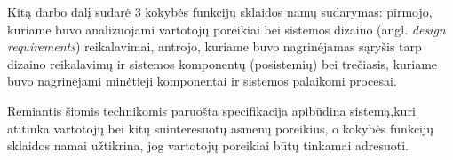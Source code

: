 \documentclass{VUMIFPSkursinis}
\begin{document}
Kitą darbo dalį sudarė 3 kokybės funkcijų sklaidos namų sudarymas: pirmojo, kuriame buvo analizuojami vartotojų poreikiai bei
sistemos dizaino (angl. \textit{design requirements}) reikalavimai, antrojo, kuriame buvo nagrinėjamas sąryšis tarp 
dizaino reikalavimų ir sistemos komponentų (posistemių) bei trečiasis, kuriame buvo nagrinėjami minėtieji komponentai 
ir sistemos palaikomi procesai.

Remiantis šiomis technikomis paruošta specifikacija apibūdina sistemą,kuri atitinka vartotojų bei kitų suinteresuotų asmenų poreikius, o kokybės funkcijų sklaidos namai užtikrina,
jog vartotojų poreikiai būtų tinkamai adresuoti.
\end{document}
